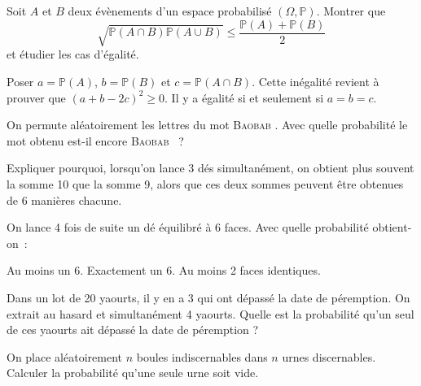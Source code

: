 \documentclass{magnolia}
\begin{document}


Soit $A$ et $B$ deux évènements d'un espace probabilisé $(\Omega,\mathbb{P})$. Montrer que
\[\sqrt{\mathbb{P}(A\cap B)\mathbb{P}(A\cup B)}\leq\frac{\mathbb{P}(A)+\mathbb{P}(B)}{2}\]
et étudier les cas d'égalité.
\begin{sol}
Poser $a=\mathbb{P}(A)$, $b=\mathbb{P}(B)$ et $c=\mathbb{P}(A\cap B)$. Cette inégalité revient à prouver
que $(a+b-2c)^2\geq 0$. Il y a égalité si et seulement si $a=b=c$.
\end{sol}

On permute aléatoirement les lettres du mot \og \textsc{Baobab} \fg. Avec quelle probabilité
le mot obtenu est-il encore \og \textsc{Baobab} \fg~?

Expliquer pourquoi, lorsqu'on lance 3 dés simultanément, on obtient plus souvent
la somme 10 que la somme 9, alors que ces deux sommes peuvent être obtenues de 6
manières chacune.

On lance 4 fois de suite un dé équilibré à 6 faces. Avec quelle probabilité
obtient-on~:
\begin{questions}
\question Au moins un 6.
\question Exactement un 6.
\question Au moins 2 faces identiques.
\end{questions}

Dans un lot de 20 yaourts, il y en a 3 qui ont dépassé la date de péremption. On extrait au
hasard et simultanément 4 yaourts. Quelle est la probabilité qu'un seul de ces yaourts ait
dépassé la date de péremption ?


On place aléatoirement $n$ boules indiscernables dans $n$ urnes discernables. Calculer la
probabilité qu'une seule urne soit vide.
\end{document}

